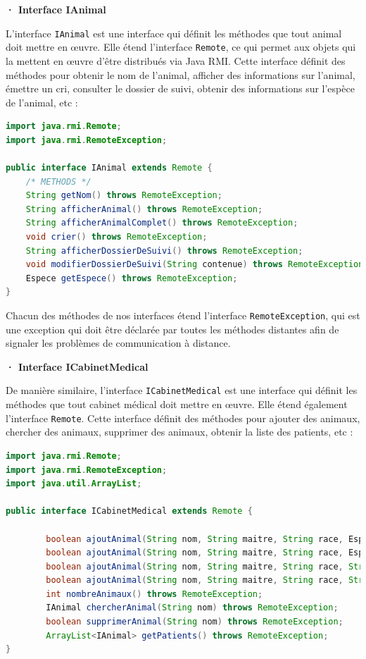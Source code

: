 \documentclass{article} %
\begin{document}
\bigskip
\textbf{· Interface IAnimal}
\bigskip

L'interface \texttt{IAnimal} est une interface qui définit les méthodes que tout animal doit mettre en œuvre. 
Elle étend l'interface \texttt{Remote}, ce qui permet aux objets qui la mettent en œuvre d'être distribués via Java RMI.
Cette interface définit des méthodes pour obtenir le nom de l'animal, afficher des informations sur l'animal, 
émettre un cri, consulter le dossier de suivi, obtenir des informations sur l'espèce de l'animal, etc :

\begin{lstlisting}[language=Java]
import java.rmi.Remote;
import java.rmi.RemoteException;

public interface IAnimal extends Remote {
	/* METHODS */
	String getNom() throws RemoteException;
	String afficherAnimal() throws RemoteException;
	String afficherAnimalComplet() throws RemoteException;
	void crier() throws RemoteException;
	String afficherDossierDeSuivi() throws RemoteException;
	void modifierDossierDeSuivi(String contenue) throws RemoteException;
	Espece getEspece() throws RemoteException;
}
\end{lstlisting}

Chacun des méthodes de nos interfaces étend l'interface \texttt{RemoteException}, 
qui est une exception qui doit être déclarée par toutes les méthodes distantes
afin de signaler les problèmes de communication à distance.

\bigskip
\textbf{· Interface ICabinetMedical}
\bigskip

De manière similaire, l'interface \texttt{ICabinetMedical} est une interface qui définit les méthodes
que tout cabinet médical doit mettre en œuvre. Elle étend également l'interface \texttt{Remote}.
Cette interface définit des méthodes pour ajouter des animaux, chercher des animaux, supprimer des animaux,
obtenir la liste des patients, etc :

\begin{lstlisting}[language=Java]
import java.rmi.Remote;
import java.rmi.RemoteException;
import java.util.ArrayList;

public interface ICabinetMedical extends Remote {

        boolean ajoutAnimal(String nom, String maitre, String race, Espece espece, String cri) throws RemoteException;
        boolean ajoutAnimal(String nom, String maitre, String race, Espece espece, String cri, String etat) throws RemoteException;
        boolean ajoutAnimal(String nom, String maitre, String race, String nomEspece, int dureeDeVieMoyenne, String cri) throws RemoteException;
        boolean ajoutAnimal(String nom, String maitre, String race, String nomEspece, int dureeDeVieMoyenne, String cri, String etat) throws RemoteException;
        int nombreAnimaux() throws RemoteException;
        IAnimal chercherAnimal(String nom) throws RemoteException;
        boolean supprimerAnimal(String nom) throws RemoteException;
        ArrayList<IAnimal> getPatients() throws RemoteException;
}
\end{lstlisting}
\end{document}
